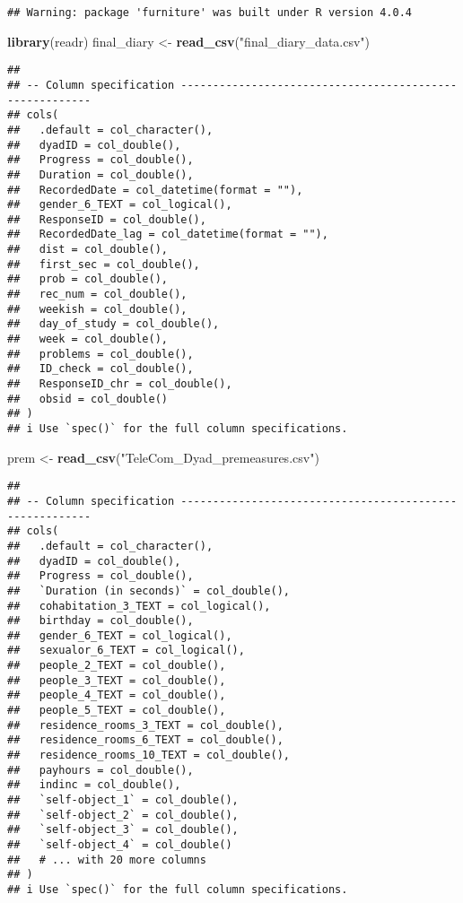 \documentclass[
]{article}
\newenvironment{Shaded}{\begin{snugshade}}{\end{snugshade}}
\newcommand{\KeywordTok}[1]{\textcolor[rgb]{0.13,0.29,0.53}{\textbf{#1}}}
\newcommand{\NormalTok}[1]{#1}
\newcommand{\StringTok}[1]{\textcolor[rgb]{0.31,0.60,0.02}{#1}}
\begin{document}
\begin{verbatim}
## Warning: package 'furniture' was built under R version 4.0.4
\end{verbatim}

\begin{Shaded}
\begin{Highlighting}[]
\KeywordTok{library}\NormalTok{(readr)}
\NormalTok{final\_diary \textless{}{-}}\StringTok{ }\KeywordTok{read\_csv}\NormalTok{(}\StringTok{"final\_diary\_data.csv"}\NormalTok{)}
\end{Highlighting}
\end{Shaded}

\begin{verbatim}
## 
## -- Column specification --------------------------------------------------------
## cols(
##   .default = col_character(),
##   dyadID = col_double(),
##   Progress = col_double(),
##   Duration = col_double(),
##   RecordedDate = col_datetime(format = ""),
##   gender_6_TEXT = col_logical(),
##   ResponseID = col_double(),
##   RecordedDate_lag = col_datetime(format = ""),
##   dist = col_double(),
##   first_sec = col_double(),
##   prob = col_double(),
##   rec_num = col_double(),
##   weekish = col_double(),
##   day_of_study = col_double(),
##   week = col_double(),
##   problems = col_double(),
##   ID_check = col_double(),
##   ResponseID_chr = col_double(),
##   obsid = col_double()
## )
## i Use `spec()` for the full column specifications.
\end{verbatim}

\begin{Shaded}
\begin{Highlighting}[]
\NormalTok{prem \textless{}{-}}\StringTok{ }\KeywordTok{read\_csv}\NormalTok{(}\StringTok{"TeleCom\_Dyad\_premeasures.csv"}\NormalTok{)}
\end{Highlighting}
\end{Shaded}

\begin{verbatim}
## 
## -- Column specification --------------------------------------------------------
## cols(
##   .default = col_character(),
##   dyadID = col_double(),
##   Progress = col_double(),
##   `Duration (in seconds)` = col_double(),
##   cohabitation_3_TEXT = col_logical(),
##   birthday = col_double(),
##   gender_6_TEXT = col_logical(),
##   sexualor_6_TEXT = col_logical(),
##   people_2_TEXT = col_double(),
##   people_3_TEXT = col_double(),
##   people_4_TEXT = col_double(),
##   people_5_TEXT = col_double(),
##   residence_rooms_3_TEXT = col_double(),
##   residence_rooms_6_TEXT = col_double(),
##   residence_rooms_10_TEXT = col_double(),
##   payhours = col_double(),
##   indinc = col_double(),
##   `self-object_1` = col_double(),
##   `self-object_2` = col_double(),
##   `self-object_3` = col_double(),
##   `self-object_4` = col_double()
##   # ... with 20 more columns
## )
## i Use `spec()` for the full column specifications.
\end{verbatim}
\end{document}
